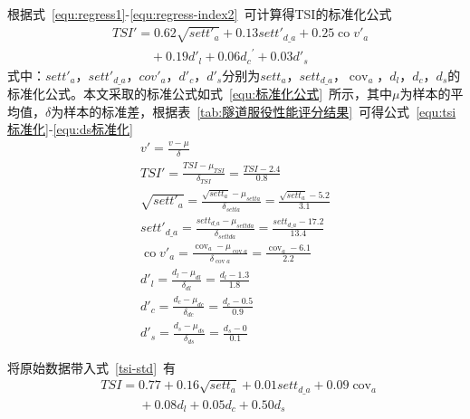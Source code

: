 根据式~\ref{equ:regress1}-\ref{equ:regress-index2}~可计算得TSI的标准化公式
\begin{align}
  \label{tsi-std}
  & TS{I}'=0.62\sqrt{set{{{{t}'}}_{a}}}+0.13set{{{{t}'}}_{d\_a}}+0.25\operatorname{co}{{{{v}'}}_{a}} \\ 
 & \quad \quad \quad +0.19{{{{d}'}}_{l}}+0.06{{d}_{c}}^{\prime }+0.03{{{{d}'}}_{s}} \nonumber
\end{align}
式中：${set{{{{t}'}}_{a}}}$，$set{{{t}'}_{d\_a}}$，${co}{{{v}'}_{a}}$，${{d}'_{c}}$，${{{d}'}_{s}}$分别为${set{{t}_{a}}}$，$set{{t}_{d\_a}}$，${{\operatorname{cov}}_{a}}$，${{d}_{l}}$，${{d}_{c}}$，${{d}_{s}}$的标准化公式。本文采取的标准公式如式~\ref{equ:标准化公式}~所示，其中$\mu$为样本的平均值，$\delta$为样本的标准差，根据表~\ref{tab:隧道服役性能评分结果}~可得公式~\ref{equ:tsi标准化}-\ref{equ:ds标准化}
\begin{gather}
 \label{equ:标准化公式} 
    {v}'=\frac{v-\mu }{\delta }\\
  \label{equ:tsi标准化}
    TS{I}'=\frac{TSI-{{\mu }_{TSI}}}{{{\delta }_{TSI}}}=\frac{TSI-2.4}{0.8} \\ 
  \label{equ:setta标准化}
    \sqrt{set{{{{t}'}}_{a}}}=\frac{\sqrt{set{{t}_{a}}}-{{\mu }_{setta}}}{{{\delta }_{setta}}}=\frac{\sqrt{set{{t}_{a}}}-5.2}{3.1} \\ 
 \label{equ:settda标准化}
    set{{{{t}'}}_{d\_a}}=\frac{set{{t}_{d\_a}}-{{\mu }_{settda}}}{{{\delta }_{settda}}}=\frac{set{{t}_{d\_a}}-17.2}{13.4} \\ 
 \label{equ:cova标准化}
    \operatorname{co}{{{{v}'}}_{a}}=\frac{{{\operatorname{cov}}_{a}}-{{\mu }_{\operatorname{cov}a}}}{{{\delta }_{\operatorname{cov}a}}}=\frac{{{\operatorname{cov}}_{a}}-6.1}{2.2} \\ 
 \label{equ:dl标准化}
    {{{{d}'}}_{l}}=\frac{{{d}_{l}}-{{\mu }_{dl}}}{{{\delta }_{dl}}}=\frac{{{d}_{l}}-1.3}{1.8} \\ 
 \label{equ:dc标准化}
    {{{{d}'}}_{c}}=\frac{{{d}_{c}}-{{\mu }_{dc}}}{{{\delta }_{dc}}}=\frac{{{d}_{c}}-0.5}{0.9} \\ 
 \label{equ:ds标准化}
    {{{{d}'}}_{s}}=\frac{{{d}_{s}}-{{\mu }_{ds}}}{{{\delta }_{ds}}}=\frac{{{d}_{s}}-0}{0.1}
\end{gather}


将原始数据带入式~\ref{tsi-std}~有
\begin{align}
  \label{tsi}
  & TSI=0.77+0.16\sqrt{set{{t}_{a}}}+0.01set{{t}_{d\_a}}+0.09{{\operatorname{cov}}_{a}} \\ 
 & \quad \quad \quad +0.08{{d}_{l}}+0.05{{d}_{c}}+0.50{{d}_{s}} \nonumber 
\end{align}

